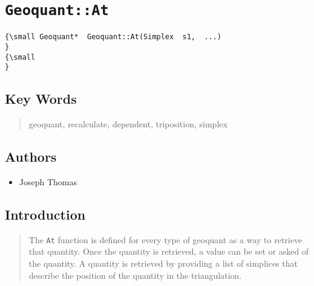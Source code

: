                       


\section*{\texttt{Geoquant::At}}

\label{f0}

\begin{quotation}
{\small }
\end{quotation}

\begin{verbatim}
{\small Geoquant*  Geoquant::At(Simplex  s1,  ...)
}
{\small   
}
\end{verbatim}

\subsection*{Key Words}

\begin{quotation}
geoquant, recalculate, dependent, triposition, simplex
\end{quotation}

\subsection*{Authors}

\begin{itemize}
\item Joseph Thomas
\end{itemize}

\subsection*{Introduction}

\begin{quotation}
The \texttt{At} function is defined for every type of geoquant as a way to
retrieve that quantity. Once the quantity is retrieved, a value can be set
or asked of the quantity. A quantity is retrieved by providing a list of
simplices that describe the position of the quantity in the triangulation.
\end{quotation}


